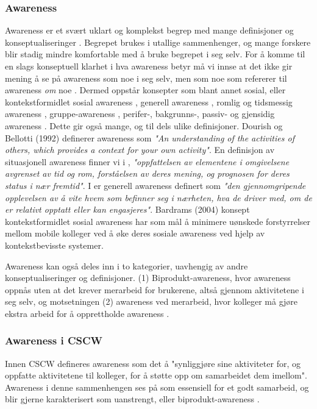\subsubsection{Awareness}
Awareness er et svært uklart og komplekst begrep med mange definisjoner og konseptualiseringer \cite{KlemetsRedundancy, Gutwin04, Schmidt02}. Begrepet brukes i utallige sammenhenger, og mange forskere blir stadig mindre komfortable med å bruke begrepet i seg selv. For å komme til en slags konseptuell klarhet i hva awareness betyr må vi innse at det ikke gir mening å se på awareness som noe i seg selv, men som noe som refererer til awareness \emph{om} noe \cite{Schmidt02}. Dermed oppstår konsepter som blant annet sosial, eller kontekstformidlet sosial awareness \cite{Bardram04}, generell awareness \cite{Gross13}, romlig og tidsmessig awareness \cite{Randell}, gruppe-awareness \cite{Gutwin04}, perifer-, bakgrunns-, passiv- og gjensidig awareness \cite{Schmidt02}. Dette gir også mange, og til dels ulike definisjoner. Dourish og Bellotti (1992) \nocite{Dourish92} definerer awareness som \emph{"An understanding of the activities of others, which provides a context for your own activity"}. En definisjon av situasjonell awareness finner vi i \cite{Endsly95}, \emph{"oppfattelsen av elementene i omgivelsene avgrenset av tid og rom, forståelsen av deres mening, og prognosen for deres status i nær fremtid"}. I \cite{Gross13} er generell awareness definert som \emph{"den gjennomgripende opplevelsen av å vite hvem som befinner seg i nærheten, hva de driver med, om de er relativt opptatt eller kan engasjeres"}. Bardrams (2004) konsept kontekstformidlet sosial awareness har som mål å minimere uønskede forstyrrelser mellom mobile kolleger ved å øke deres sosiale awareness ved hjelp av kontekstbevisste systemer. 

\noindent
Awareness kan også deles inn i to kategorier, uavhengig av andre konseptualiseringer og definisjoner. (1) Biprodukt-awareness, hvor awareness oppnås uten at det krever merarbeid for brukerene, altså gjennom aktivitetene i seg selv, og motsetningen (2) awareness ved merarbeid, hvor kolleger må gjøre ekstra arbeid for å opprettholde awareness \cite{Randell}. 


\subsubsection{Awareness i CSCW}
Innen CSCW defineres awareness som det å "synliggjøre sine aktiviteter for, og oppfatte aktivitetene til kolleger, for å støtte opp om samarbeidet dem imellom". Awareness i denne sammenhengen ses på som essensiell for et godt samarbeid, og blir gjerne karakterisert som uanstrengt, eller biprodukt-awareness \cite{Randell}. 

